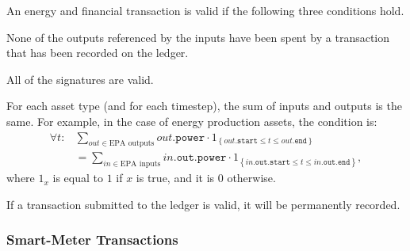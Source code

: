An energy and financial transaction is valid if the following three conditions hold.
\begin{compactitem}
\item None of the outputs referenced by the inputs have been spent by a transaction that has been recorded on the ledger.
\item All of the signatures are valid.
\item For each asset type (and for each timestep), the sum of inputs and outputs is the same.
For example, in the case of energy production assets, the condition is:
\begin{align}
\forall t: & \sum_{out \in \text{EPA outputs}} out.\mathtt{power} \cdot 1_{\left\{out.\mathtt{start} \leq t \leq out.\mathtt{end}\right\}} \nonumber \\
& = \sum_{in \in \text{EPA inputs}} in.\mathtt{out}.\mathtt{power} \cdot 1_{\left\{in.\mathtt{out}.\mathtt{start} \leq t \leq in.\mathtt{out}.\mathtt{end}\right\}} ,
\end{align}
where $1_x$ is equal to $1$ if $x$ is true, and it is $0$ otherwise.
\end{compactitem}
If a transaction submitted to the ledger is valid, it will be permanently recorded.

\subsubsection{Smart-Meter Transactions}


